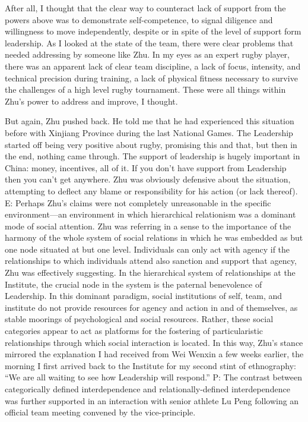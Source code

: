 \begin{CJK}{UTF8}{gbsn}
After all, I thought that the clear way to counteract lack of support from the powers above was to demonstrate self-competence, to signal diligence and willingness to move independently, despite or in spite of the level of support form leadership.  As I looked at the state of the team, there were clear problems that needed addressing by someone like Zhu.  In my eyes as an expert rugby player, there was an apparent lack of clear team discipline, a lack of focus, intensity, and technical precision during training, a lack of physical fitness necessary to survive the challenges of a high level rugby tournament.  These were all things within Zhu’s power to address and improve, I thought.

But again, Zhu pushed back.  He told me that he had experienced this situation before with Xinjiang Province during the last National Games.  The Leadership started off being very positive about rugby, promising this and that, but then in the end, nothing came through.  The support of leadership is hugely important in China: money, incentives, all of it.  If you don't have support from Leadership then you can't get anywhere.  Zhu was obviously defensive about the situation, attempting to deflect any blame or responsibility for his action (or lack thereof).
E: Perhaps Zhu's claims were not completely unreasonable in the specific environment---an environment in which hierarchical relationism was a dominant mode of social attention.
Zhu was referring in a sense to the importance of the harmony of the whole system of social relations in which he was embedded as but one node situated at but one level. Individuals can only act with agency if the relationships to which individuals attend also sanction and support that agency, Zhu was effectively suggesting.
In the hierarchical system of relationships at the Institute, the crucial node in the system is the paternal benevolence of Leadership.  In this dominant paradigm, social institutions of self, team, and institute do not provide resources for agency and action in and of themselves, as stable moorings of psychological and social resources. Rather, these social categories appear to act as platforms for the fostering of particularistic relationships through which social interaction is located.  In this way, Zhu's stance mirrored the explanation I had received from Wei Wenxin a few weeks earlier, the morning I first arrived back to the Institute for my second stint of ethnography: ``We are all waiting to see how Leadership will respond.''
P: The contrast between categorically defined interdependence and relationally-defined interdependence was further supported in an interaction with senior athlete Lu Peng following an official team meeting convened by the vice-principle.


\end{CJK}
